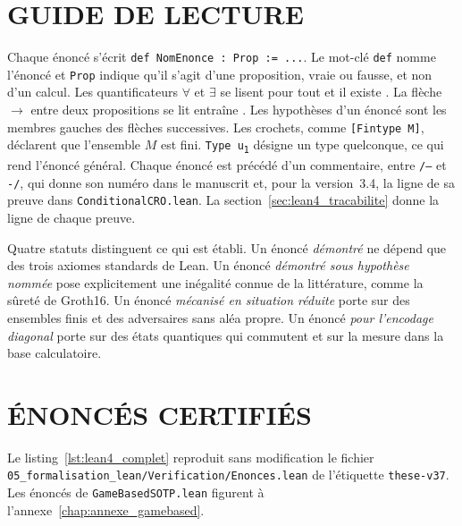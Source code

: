 \section{GUIDE DE LECTURE}
\label{sec:lean4_guide}

\begin{sloppypar}
Chaque \'enonc\'e s'\'ecrit \texttt{def NomEnonce : Prop := ...}. Le mot-cl\'e
\texttt{def} nomme l'\'enonc\'e et \texttt{Prop} indique qu'il s'agit d'une proposition, vraie
ou fausse, et non d'un calcul. Les quantificateurs $\forall$ et $\exists$ se lisent \og pour
tout \fg{} et \og il existe \fg. La fl\`eche $\to$ entre deux propositions se lit \og
entra\^ine \fg. Les hypoth\`eses d'un \'enonc\'e sont les membres gauches des fl\`eches
successives. Les crochets, comme \texttt{[Fintype M]}, d\'eclarent que l'ensemble $M$ est fini.
\texttt{Type u\textsubscript{1}} d\'esigne un type quelconque, ce qui rend l'\'enonc\'e g\'en\'eral.
Chaque \'enonc\'e est pr\'ec\'ed\'e d'un commentaire, entre \texttt{/--} et \texttt{-/}, qui
donne son num\'ero dans le manuscrit et, pour la version~3.4, la ligne de sa preuve dans
\texttt{ConditionalCRO.lean}. La section~\ref{sec:lean4_tracabilite} donne la ligne de chaque
preuve.

Quatre statuts distinguent ce qui est \'etabli. Un \'enonc\'e \emph{d\'emontr\'e} ne d\'epend que
des trois axiomes standards de Lean. Un \'enonc\'e \emph{d\'emontr\'e sous hypoth\`ese nomm\'ee} pose
explicitement une in\'egalit\'e connue de la litt\'erature, comme la s\^uret\'e de Groth16. Un
\'enonc\'e \emph{m\'ecanis\'e en situation r\'eduite} porte sur des ensembles finis et des
adversaires sans al\'ea propre. Un \'enonc\'e \emph{pour l'encodage diagonal} porte sur des \'etats
quantiques qui commutent et sur la mesure dans la base calculatoire.
\end{sloppypar}

\section{\'ENONC\'ES CERTIFI\'ES}
\label{sec:lean4_code}

\begin{sloppypar}
Le listing~\ref{lst:lean4_complet} reproduit sans modification le fichier
\texttt{05\_formalisation\_lean/Verification/Enonces.lean} de l'\'etiquette
\texttt{these-v37}. Les \'enonc\'es de \texttt{GameBasedSOTP.lean} figurent \`a
l'annexe~\ref{chap:annexe_gamebased}.
\end{sloppypar}

